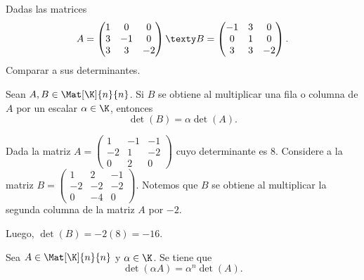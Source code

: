 \documentclass[compacto,10pt]{pubciencias-notas}
\begin{document}
\begin{ejer}\hspace{0pt} Dadas las matrices
\[
A = 
    \begin{pmatrix}
        1 & 0 & 0 \\
        3 & -1 & 0 \\
        3 & 3 & -2 
    \end{pmatrix}
\texty
B =
    \begin{pmatrix}
        -1 & 3 & 0 \\
        0 & 1 & 0 \\
        3 & 3 & -2
    \end{pmatrix}.
\]
Comparar a sus determinantes.
\end{ejer}

\begin{prop}
    Sean $A, B \in \Mat[\K]{n}{n}$. Si $B$ se obtiene al multiplicar una fila o columna de $A$ por un escalar $\alpha \in \K$, entonces
    \[
        \det(B) = \alpha \det(A).
    \]
\end{prop}

\begin{ejem}\hspace{0pt} Dada la matriz $A =
\begin{pmatrix}1 & -1 & -1 \\-2 & 1 & -2 \\0 & 2 & 0\end{pmatrix}$ cuyo determinante es 8. Considere a la matriz $B =
\begin{pmatrix}1 & 2 & -1 \\-2 & -2 & -2 \\0 & -4 & 0\end{pmatrix}$. Notemos que $B$ se obtiene al multiplicar la segunda columna de la matriz $A$ por $-2$.
    
    \noindent Luego, $\det(B) = -2(8) = -16$.
\end{ejem}


\begin{prop}
    Sea $A\in \Mat[\K]{n}{n}$ y $\alpha \in\K$. Se tiene que
    \[
        \det(\alpha A) = \alpha^n \det(A).
    \]
\end{prop}
\end{document}
